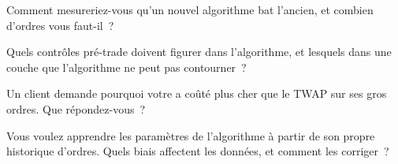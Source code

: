 \begin{interviewq}\label{iq:mx:build-an-execution-algorithm:3}
Comment mesureriez-vous qu'un nouvel algorithme bat l'ancien, et combien d'ordres vous faut-il~?
\end{interviewq}

\begin{interviewq}\label{iq:mx:build-an-execution-algorithm:4}
Quels contrôles pré-trade doivent figurer dans l'algorithme, et lesquels dans une couche que l'algorithme ne peut pas contourner~?
\end{interviewq}

\begin{interviewq}\label{iq:mx:build-an-execution-algorithm:5}
Un client demande pourquoi votre  a coûté plus cher que le TWAP sur ses gros ordres. Que répondez-vous~?
\end{interviewq}

\begin{interviewq}\label{iq:mx:build-an-execution-algorithm:6}
Vous voulez apprendre les paramètres de l'algorithme à partir de son propre historique d'ordres. Quels biais affectent les données, et comment les corriger~?
\end{interviewq}
